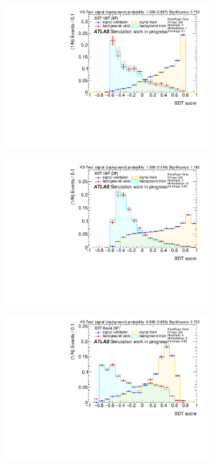 \begin{figure}[htbp]
    \centering
    \begin{subfigure}[t]{0.49\textwidth}
        \includegraphics[width=\textwidth]{./plots/mva/scan/VBF_SF_bdt_output.pdf}
    \end{subfigure}
    \begin{subfigure}[t]{0.49\textwidth}
        \includegraphics[width=\textwidth]{./plots/mva/scan/VBF_DF_bdt_output.pdf}
    \end{subfigure}
    \begin{subfigure}[t]{0.49\textwidth}
        \includegraphics[width=\textwidth]{./plots/mva/scan/BOOST_SF_bdt_output.pdf}

\end{subfigure}
\end{figure}
